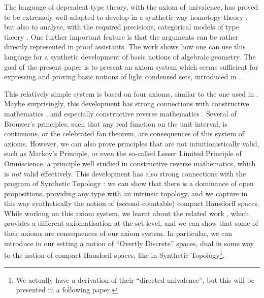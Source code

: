 The language of dependent type theory, with the axiom of univalence, has proved to be extremely well-adapted to
develop in a synthetic way homotopy theory \cite{hott}, but
also to analyse, with the required precisions, categorical models of type theory \cite{vanderweide2024}. One
further important feature is that
the arguments can be rather directly represented in proof assistants. The work \cite{draft} shows how one can use
this language for a synthetic development of basic notions of algebraic geometry. The goal of the present paper
is to present an axiom system which seems sufficient for expressing and proving basic notions of light condensed
sets, introduced in \cite{Scholze}.

This relatively simple system is based on four axioms, similar to the one used
in \cite{draft}. Maybe surprisingly, this development has strong connections with constructive mathematics \cite{Bishop},
and especially constructive reverse mathematics \cite{ReverseMathsBishop,HannesDiener}. Several of Brouwer's principles, such that
any real function on the unit interval, is continuous, or the celebrated fan theorem, are consequences of this system
of axioms. However, we can also prove principles that are not intuitionistically valid, such as Markov's Principle,
or even the so-called Lesser Limited Principle of Omniscience, a principle well studied in constructive reverse mathematics,
which is {\em not} valid effectively.  This development has also strong connections with the program of Synthetic
Topology \cite{SyntheticTopologyEscardo,SyntheticTopologyLesnik}:
we can show that there is a dominance of open propositions, providing any type with an intrinsic
topology, and we capture in this way synthetically the notion of (second-countable) compact Hausdorff spaces.
While working on this axiom system, we learnt about the related work \cite{bc24}, which provides a different axiomatisation
at the set level, and we can show that some of their axioms are consequences of our axiom system. In particular, we can introduce
in our setting a notion of ``Overtly Discrete'' spaces, dual in some way to the notion of compact Hausforff spaces, like
in Synthetic Topology\footnote{We actually have a
derivation of their ``directed univalence'', but this will be presented in a following paper.}.

